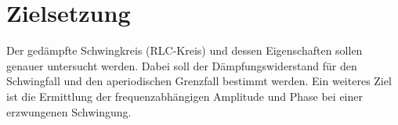 \section{Zielsetzung}
\label{sec:Zielsetzung}
Der gedämpfte Schwingkreis (RLC-Kreis) und dessen Eigenschaften sollen genauer untersucht werden.
Dabei soll der Dämpfungswiderstand für den Schwingfall und den aperiodischen Grenzfall bestimmt werden.
Ein weiteres Ziel ist die Ermittlung der frequenzabhängigen Amplitude und Phase bei einer erzwungenen Schwingung.